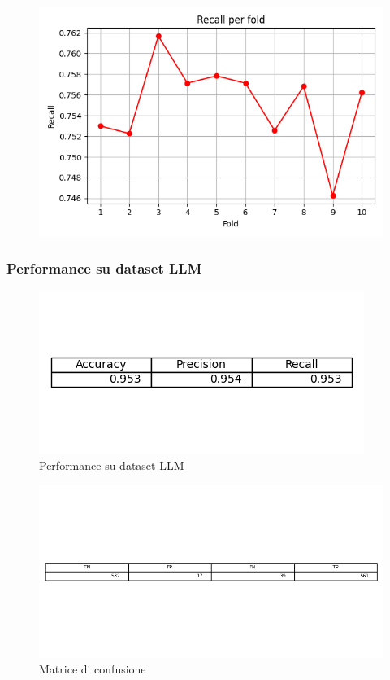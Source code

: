 \documentclass[12pt,a4paper]{report} %
\begin{document}
\begin{figure}[H]
    \centering
    \includegraphics[width=0.75\linewidth]{immagini_modeling/recall_lr_tfidf.png}
    
    \label{fig:enter-label}
\end{figure}
\subsubsection{Performance su dataset LLM}
\begin{figure}[H]
    \centering
    \includegraphics[width=0.75\linewidth]{immagini_modeling/lr_tfidf_llm.png}
    \caption{Performance su dataset LLM}
    \label{fig:enter-label}
\end{figure}
\begin{figure}[H]
    \centering
    \includegraphics[width=1\linewidth]{immagini_modeling/matrice_tfidf_lr.png}
    \caption{Matrice di confusione}
    \label{fig:enter-label}
\end{figure}
\end{document}
